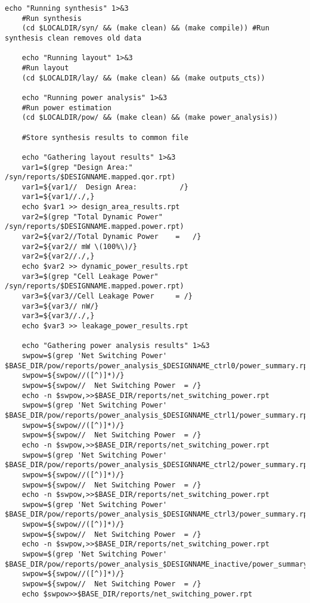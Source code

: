\begin{lstlisting}[caption={HLS Script source code},label=lst:hlsscriptsourcecode]
	echo "Running synthesis" 1>&3
	#Run synthesis
	(cd $LOCALDIR/syn/ && (make clean) && (make compile)) #Run synthesis clean removes old data
	
	echo "Running layout" 1>&3
	#Run layout
	(cd $LOCALDIR/lay/ && (make clean) && (make outputs_cts))
	
	echo "Running power analysis" 1>&3
	#Run power estimation
	(cd $LOCALDIR/pow/ && (make clean) && (make power_analysis))
	
	#Store synthesis results to common file
	
	echo "Gathering layout results" 1>&3
	var1=$(grep "Design Area:" /syn/reports/$DESIGNNAME.mapped.qor.rpt)
	var1=${var1//  Design Area:          /}
	var1=${var1//./,}
	echo $var1 >> design_area_results.rpt
	var2=$(grep "Total Dynamic Power" /syn/reports/$DESIGNNAME.mapped.power.rpt)
	var2=${var2//Total Dynamic Power    =   /}
	var2=${var2// mW \(100%\)/}
	var2=${var2//./,}
	echo $var2 >> dynamic_power_results.rpt
	var3=$(grep "Cell Leakage Power" /syn/reports/$DESIGNNAME.mapped.power.rpt)
	var3=${var3//Cell Leakage Power     = /}
	var3=${var3// nW/}
	var3=${var3//./,}
	echo $var3 >> leakage_power_results.rpt
	
	echo "Gathering power analysis results" 1>&3
	swpow=$(grep 'Net Switching Power' $BASE_DIR/pow/reports/power_analysis_$DESIGNNAME_ctrl0/power_summary.rpt)
	swpow=${swpow//([^)]*)/}
	swpow=${swpow//  Net Switching Power  = /}
	echo -n $swpow,>>$BASE_DIR/reports/net_switching_power.rpt
	swpow=$(grep 'Net Switching Power' $BASE_DIR/pow/reports/power_analysis_$DESIGNNAME_ctrl1/power_summary.rpt)
	swpow=${swpow//([^)]*)/}
	swpow=${swpow//  Net Switching Power  = /}
	echo -n $swpow,>>$BASE_DIR/reports/net_switching_power.rpt
	swpow=$(grep 'Net Switching Power' $BASE_DIR/pow/reports/power_analysis_$DESIGNNAME_ctrl2/power_summary.rpt)
	swpow=${swpow//([^)]*)/}
	swpow=${swpow//  Net Switching Power  = /}
	echo -n $swpow,>>$BASE_DIR/reports/net_switching_power.rpt
	swpow=$(grep 'Net Switching Power' $BASE_DIR/pow/reports/power_analysis_$DESIGNNAME_ctrl3/power_summary.rpt)
	swpow=${swpow//([^)]*)/}
	swpow=${swpow//  Net Switching Power  = /}
	echo -n $swpow,>>$BASE_DIR/reports/net_switching_power.rpt
	swpow=$(grep 'Net Switching Power' $BASE_DIR/pow/reports/power_analysis_$DESIGNNAME_inactive/power_summary.rpt)
	swpow=${swpow//([^)]*)/}
	swpow=${swpow//  Net Switching Power  = /}
	echo $swpow>>$BASE_DIR/reports/net_switching_power.rpt


\end{lstlisting}

